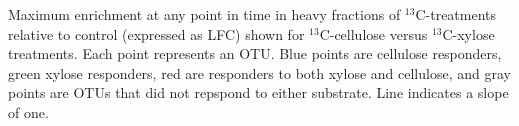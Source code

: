 Maximum enrichment at any point in time in heavy fractions of
$^{13}$C-treatments relative to control (expressed as LFC) shown for
$^{13}$C-cellulose versus $^{13}$C-xylose treatments. Each point represents an
OTU. Blue points are cellulose responders, green xylose responders, red are
responders to both xylose and cellulose, and gray points are OTUs that did not
repspond to either substrate. Line indicates a slope of one.

